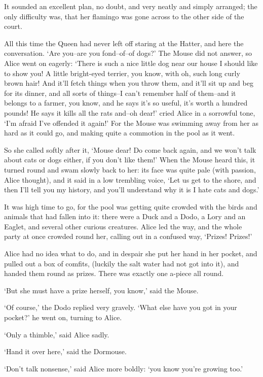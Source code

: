 \documentclass[statementpaper,twoside,openany]{memoir}
\begin{document}
It sounded an excellent plan, no doubt, and very neatly and simply arranged; the only difficulty was, that her flamingo was gone across to the other side of the court.

All this time the Queen had never left off staring at the Hatter, and here the conversation. `Are you--are you fond--of--of dogs?' The Mouse did not answer, so Alice went on eagerly: `There is such a nice little dog near our house I should like to show you! A little bright-eyed terrier, you know, with oh, such long curly brown hair! And it'll fetch things when you throw them, and it'll sit up and beg for its dinner, and all sorts of things--I can't remember half of them--and it belongs to a farmer, you know, and he says it's so useful, it's worth a hundred pounds! He says it kills all the rats and--oh dear!' cried Alice in a sorrowful tone, `I'm afraid I've offended it again!' For the Mouse was swimming away from her as hard as it could go, and making quite a commotion in the pool as it went.

So she called softly after it, `Mouse dear! Do come back again, and we won't talk about cats or dogs either, if you don't like them!' When the Mouse heard this, it turned round and swam slowly back to her: its face was quite pale (with passion, Alice thought), and it said in a low trembling voice, `Let us get to the shore, and then I'll tell you my history, and you'll understand why it is I hate cats and dogs.'

It was high time to go, for the pool was getting quite crowded with the birds and animals that had fallen into it: there were a Duck and a Dodo, a Lory and an Eaglet, and several other curious creatures. Alice led the way, and the whole party at once crowded round her, calling out in a confused way, `Prizes! Prizes!'

Alice had no idea what to do, and in despair she put her hand in her pocket, and pulled out a box of comfits, (luckily the salt water had not got into it), and handed them round as prizes. There was exactly one a-piece all round.

`But she must have a prize herself, you know,' said the Mouse.

`Of course,' the Dodo replied very gravely. `What else have you got in your pocket?' he went on, turning to Alice.

`Only a thimble,' said Alice sadly.

`Hand it over here,' said the Dormouse.

`Don't talk nonsense,' said Alice more boldly: `you know you're growing too.'
\end{document}
